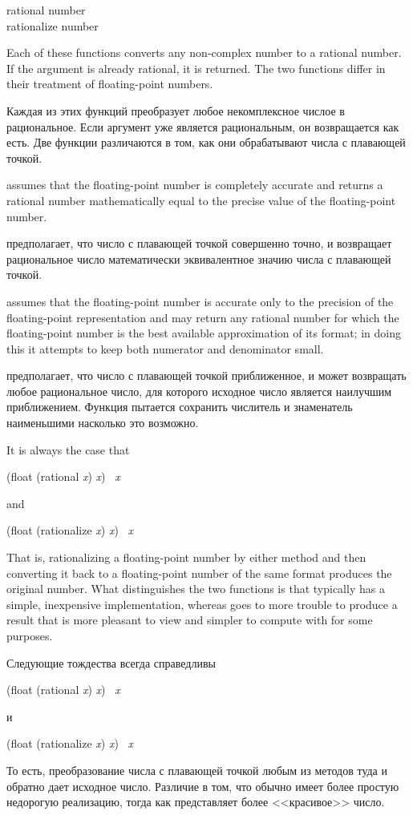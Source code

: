 \begin{defun}[Function]
rational number \\
rationalize number

Each of these functions converts any non-complex number to a rational
number.  If the argument is already rational, it is returned.
The two functions differ in their treatment of floating-point numbers.

Каждая из этих функций преобразует любое некомплексное числое в рациональное.
Если аргумент уже является рациональным, он возвращается как есть.
Две функции различаются в том, как они обрабатывают числа с плавающей точкой.

 assumes that the floating-point number is completely accurate
and returns a rational number mathematically equal to the precise
value of the floating-point number.

 предполагает, что число с плавающей точкой совершенно точно, и
возвращает рациональное число математически эквивалентное значию числа с
плавающей точкой.

 assumes that the
floating-point number is accurate only to the precision of the
floating-point representation and may return any rational number for
which the floating-point number is the best available approximation of
its format; in doing this it attempts to keep both numerator and
denominator small.

 предполагает, что число с плавающей точкой приближенное, и
может возвращать любое рациональное число, для которого исходное число является
наилучшим приближением. Функция пытается сохранить числитель и знаменатель
наименьшими насколько это возможно.

It is always the case that
\begin{lisp}
(float (rational \emph{x}) \emph{x}) \EQ\ \emph{x}
\end{lisp}
and
\begin{lisp}
(float (rationalize \emph{x}) \emph{x}) \EQ\ \emph{x}
\end{lisp}
That is, rationalizing a floating-point number by either method
and then converting it back
to a floating-point number of the same format produces the original number.
What distinguishes the two functions is that  typically
has a simple, inexpensive implementation, whereas  goes
to more trouble to produce a result that is more pleasant to view and
simpler to compute with for some purposes.

Следующие тождества всегда справедливы
\begin{lisp}
(float (rational \emph{x}) \emph{x}) \EQ\ \emph{x}
\end{lisp}
и
\begin{lisp}
(float (rationalize \emph{x}) \emph{x}) \EQ\ \emph{x}
\end{lisp}
То есть, преобразование числа с плавающей точкой любым из методов туда и обратно
дает исходное число.
Различие в том, что  обычно имеет более простую недорогую
реализацию, тогда как  представляет более <<красивое>> число.
\end{defun}

